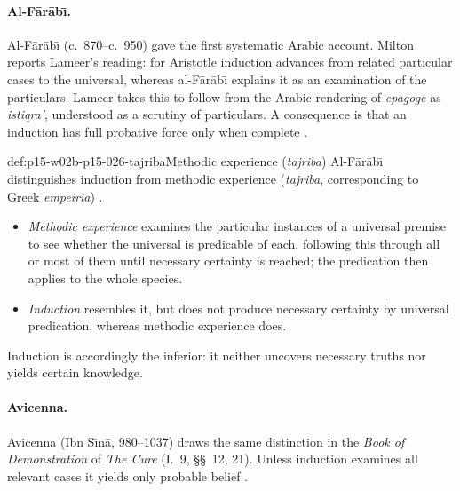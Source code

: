 \paragraph{Al-F\={a}r\={a}b\={\i}.}
Al-F\={a}r\={a}b\={\i} (c.~870--c.~950) gave the first systematic Arabic
account. Milton reports Lameer's reading: for Aristotle induction advances
from related particular cases to the universal, whereas al-F\={a}r\={a}b\={\i}
explains it as an examination of the particulars. Lameer takes this to
follow from the Arabic rendering of \emph{epagoge} as \emph{istiqra'},
understood as a scrutiny of particulars. A consequence is that an
induction has full probative force only when complete
\cite[p.~14]{Milton2011InductionBeforeHume}.

\begin{hbdefinition}{def:p15-w02b-p15-026-tajriba}{Methodic experience (\emph{tajriba})}
Al-F\={a}r\={a}b\={\i} distinguishes induction from methodic experience
(\emph{tajriba}, corresponding to Greek \emph{empeiria})
\cite[pp.~14--15]{Milton2011InductionBeforeHume}.
\begin{itemize}
\item \emph{Methodic experience} examines the particular instances of a
  universal premise to see whether the universal is predicable of each,
  following this through all or most of them until necessary certainty is
  reached; the predication then applies to the whole species.
\item \emph{Induction} resembles it, but does not produce necessary
  certainty by universal predication, whereas methodic experience does.
\end{itemize}
Induction is accordingly the inferior: it neither uncovers necessary
truths nor yields certain knowledge.
\end{hbdefinition}

\paragraph{Avicenna.}
Avicenna (Ibn S\={\i}n\={a}, 980--1037) draws the same distinction in the
\emph{Book of Demonstration} of \emph{The Cure} (I.~9, \S\S~12, 21).
Unless induction examines all relevant cases it yields only probable
belief \cite[p.~15]{Milton2011InductionBeforeHume}.

